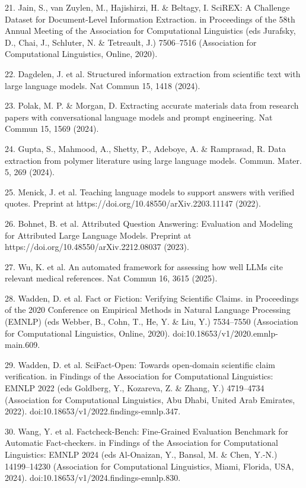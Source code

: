 \documentclass[
]{article}
\begin{document}
21. Jain, S., van Zuylen, M., Hajishirzi, H. \& Beltagy, I. SciREX: A
Challenge Dataset for Document-Level Information Extraction. in
Proceedings of the 58th Annual Meeting of the Association for
Computational Linguistics (eds Jurafsky, D., Chai, J., Schluter, N. \&
Tetreault, J.) 7506--7516 (Association for Computational Linguistics,
Online, 2020).

22. Dagdelen, J. et al. Structured information extraction from
scientific text with large language models. Nat Commun 15, 1418 (2024).

23. Polak, M. P. \& Morgan, D. Extracting accurate materials data from
research papers with conversational language models and prompt
engineering. Nat Commun 15, 1569 (2024).

24. Gupta, S., Mahmood, A., Shetty, P., Adeboye, A. \& Ramprasad, R.
Data extraction from polymer literature using large language models.
Commun. Mater. 5, 269 (2024).

25. Menick, J. et al. Teaching language models to support answers with
verified quotes. Preprint at https://doi.org/10.48550/arXiv.2203.11147
(2022).

26. Bohnet, B. et al. Attributed Question Answering: Evaluation and
Modeling for Attributed Large Language Models. Preprint at
https://doi.org/10.48550/arXiv.2212.08037 (2023).

27. Wu, K. et al. An automated framework for assessing how well LLMs
cite relevant medical references. Nat Commun 16, 3615 (2025).

28. Wadden, D. et al. Fact or Fiction: Verifying Scientific Claims. in
Proceedings of the 2020 Conference on Empirical Methods in Natural
Language Processing (EMNLP) (eds Webber, B., Cohn, T., He, Y. \& Liu,
Y.) 7534--7550 (Association for Computational Linguistics, Online,
2020). doi:10.18653/v1/2020.emnlp-main.609.

29. Wadden, D. et al. SciFact-Open: Towards open-domain scientific claim
verification. in Findings of the Association for Computational
Linguistics: EMNLP 2022 (eds Goldberg, Y., Kozareva, Z. \& Zhang, Y.)
4719--4734 (Association for Computational Linguistics, Abu Dhabi, United
Arab Emirates, 2022). doi:10.18653/v1/2022.findings-emnlp.347.

30. Wang, Y. et al. Factcheck-Bench: Fine-Grained Evaluation Benchmark
for Automatic Fact-checkers. in Findings of the Association for
Computational Linguistics: EMNLP 2024 (eds Al-Onaizan, Y., Bansal, M. \&
Chen, Y.-N.) 14199--14230 (Association for Computational Linguistics,
Miami, Florida, USA, 2024). doi:10.18653/v1/2024.findings-emnlp.830.
\end{document}
